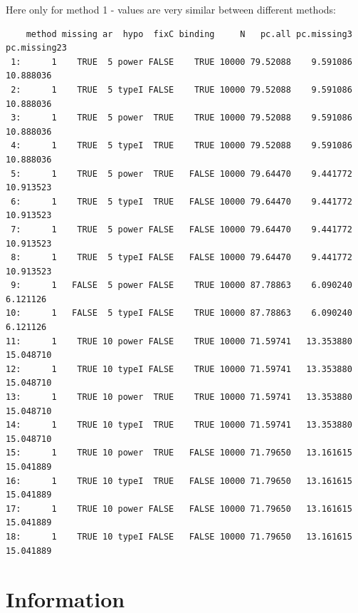 \documentclass[12pt]{article}
\begin{document}
Here only for method 1 - values are very similar between different
methods:
\begin{verbatim}
    method missing ar  hypo  fixC binding     N   pc.all pc.missing3 pc.missing23
 1:      1    TRUE  5 power FALSE    TRUE 10000 79.52088    9.591086    10.888036
 2:      1    TRUE  5 typeI FALSE    TRUE 10000 79.52088    9.591086    10.888036
 3:      1    TRUE  5 power  TRUE    TRUE 10000 79.52088    9.591086    10.888036
 4:      1    TRUE  5 typeI  TRUE    TRUE 10000 79.52088    9.591086    10.888036
 5:      1    TRUE  5 power  TRUE   FALSE 10000 79.64470    9.441772    10.913523
 6:      1    TRUE  5 typeI  TRUE   FALSE 10000 79.64470    9.441772    10.913523
 7:      1    TRUE  5 power FALSE   FALSE 10000 79.64470    9.441772    10.913523
 8:      1    TRUE  5 typeI FALSE   FALSE 10000 79.64470    9.441772    10.913523
 9:      1   FALSE  5 power FALSE    TRUE 10000 87.78863    6.090240     6.121126
10:      1   FALSE  5 typeI FALSE    TRUE 10000 87.78863    6.090240     6.121126
11:      1    TRUE 10 power FALSE    TRUE 10000 71.59741   13.353880    15.048710
12:      1    TRUE 10 typeI FALSE    TRUE 10000 71.59741   13.353880    15.048710
13:      1    TRUE 10 power  TRUE    TRUE 10000 71.59741   13.353880    15.048710
14:      1    TRUE 10 typeI  TRUE    TRUE 10000 71.59741   13.353880    15.048710
15:      1    TRUE 10 power  TRUE   FALSE 10000 71.79650   13.161615    15.041889
16:      1    TRUE 10 typeI  TRUE   FALSE 10000 71.79650   13.161615    15.041889
17:      1    TRUE 10 power FALSE   FALSE 10000 71.79650   13.161615    15.041889
18:      1    TRUE 10 typeI FALSE   FALSE 10000 71.79650   13.161615    15.041889
\end{verbatim}

\clearpage

\section{Information}
\label{sec:orge03fdcc}
\end{document}
